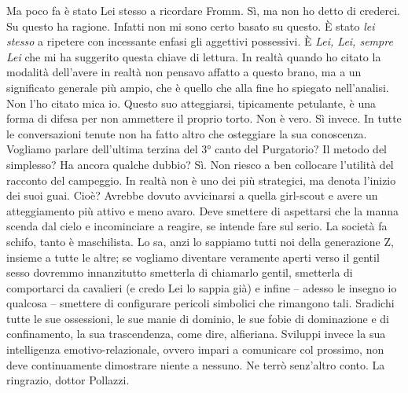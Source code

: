 \documentclass[a4paper,12pt]{article}
\newcommand{\Walter}{\speak{W}}
\newcommand{\Pollazzi}{\speak{P}}
\begin{document}
\begin{dialogue}
\Pollazzi Ma poco fa è stato Lei stesso a ricordare Fromm.
\Walter  Sì, ma non ho detto di crederci.
\Pollazzi Su questo ha ragione. Infatti non mi sono certo basato su questo. È
stato \emph{lei stesso} a ripetere con incessante enfasi gli aggettivi
possessivi. È \emph{Lei, Lei, sempre Lei} che mi ha suggerito questa chiave di
lettura. In realtà quando ho citato la modalità dell’avere in realtà non pensavo
affatto a questo brano, ma a un significato generale più ampio, che è quello che
alla fine ho spiegato nell’analisi. Non l'ho citato mica io.
Questo suo atteggiarsi, tipicamente petulante, è una forma di difesa per non ammettere il proprio torto.
\Walter  Non è vero.
\Pollazzi Sì invece. In tutte le conversazioni tenute non ha fatto altro che osteggiare la sua conoscenza. Vogliamo parlare dell’ultima terzina del 3° canto del Purgatorio? Il metodo del simplesso?  Ha ancora qualche dubbio?
\Walter  Sì. Non riesco a ben collocare l’utilità del racconto del campeggio.
\Pollazzi In realtà non è uno dei più strategici, ma denota l’inizio dei suoi guai.
\Walter  Cioè?
\Pollazzi Avrebbe dovuto avvicinarsi a quella girl-scout e avere un atteggiamento più attivo e meno avaro. Deve smettere di aspettarsi che la manna scenda dal cielo e incominciare a reagire, se intende fare sul serio. La società fa schifo, tanto è maschilista. Lo sa, anzi lo sappiamo tutti noi della generazione Z, insieme a tutte le altre; se vogliamo diventare veramente aperti verso il gentil sesso dovremmo innanzitutto smetterla di chiamarlo gentil, smetterla di comportarci da cavalieri (e credo Lei lo sappia già) e infine – adesso le insegno io qualcosa – smettere di configurare pericoli simbolici che rimangono tali. Sradichi tutte le sue ossessioni, le sue manie di dominio, le sue fobie di dominazione e di confinamento, la sua trascendenza, come dire, alfieriana. Sviluppi invece la sua intelligenza emotivo-relazionale, ovvero impari a comunicare col prossimo, non deve continuamente dimostrare niente a nessuno.
\Walter  Ne terrò senz’altro conto. La ringrazio, dottor Pollazzi.
\end{dialogue}
\end{document}
